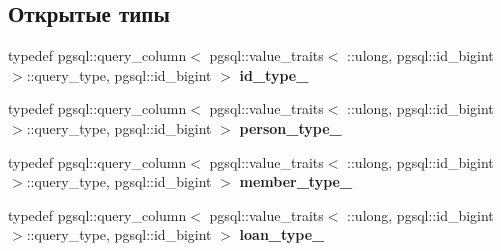 \subsection*{Открытые типы}
\begin{DoxyCompactItemize}
\item 
typedef pgsql\+::query\+\_\+column$<$ pgsql\+::value\+\_\+traits$<$ \+::ulong, pgsql\+::id\+\_\+bigint $>$\+::query\+\_\+type, pgsql\+::id\+\_\+bigint $>$ {\bfseries id\+\_\+type\+\_\+}\hypertarget{structodb_1_1pointer__query__columns_3_01_1_1kpk_1_1data_1_1_loan_oper_00_01id__pgsql_00_01_a_01_4_aa1aa4e5500584872557ff25b16da4b6d}{}\label{structodb_1_1pointer__query__columns_3_01_1_1kpk_1_1data_1_1_loan_oper_00_01id__pgsql_00_01_a_01_4_aa1aa4e5500584872557ff25b16da4b6d}

\item 
typedef pgsql\+::query\+\_\+column$<$ pgsql\+::value\+\_\+traits$<$ \+::ulong, pgsql\+::id\+\_\+bigint $>$\+::query\+\_\+type, pgsql\+::id\+\_\+bigint $>$ {\bfseries person\+\_\+type\+\_\+}\hypertarget{structodb_1_1pointer__query__columns_3_01_1_1kpk_1_1data_1_1_loan_oper_00_01id__pgsql_00_01_a_01_4_a4fe651a281803c40ddd143a82d36e95d}{}\label{structodb_1_1pointer__query__columns_3_01_1_1kpk_1_1data_1_1_loan_oper_00_01id__pgsql_00_01_a_01_4_a4fe651a281803c40ddd143a82d36e95d}

\item 
typedef pgsql\+::query\+\_\+column$<$ pgsql\+::value\+\_\+traits$<$ \+::ulong, pgsql\+::id\+\_\+bigint $>$\+::query\+\_\+type, pgsql\+::id\+\_\+bigint $>$ {\bfseries member\+\_\+type\+\_\+}\hypertarget{structodb_1_1pointer__query__columns_3_01_1_1kpk_1_1data_1_1_loan_oper_00_01id__pgsql_00_01_a_01_4_a4b6a9936fa698bfdcff4beaee162354d}{}\label{structodb_1_1pointer__query__columns_3_01_1_1kpk_1_1data_1_1_loan_oper_00_01id__pgsql_00_01_a_01_4_a4b6a9936fa698bfdcff4beaee162354d}

\item 
typedef pgsql\+::query\+\_\+column$<$ pgsql\+::value\+\_\+traits$<$ \+::ulong, pgsql\+::id\+\_\+bigint $>$\+::query\+\_\+type, pgsql\+::id\+\_\+bigint $>$ {\bfseries loan\+\_\+type\+\_\+}\hypertarget{structodb_1_1pointer__query__columns_3_01_1_1kpk_1_1data_1_1_loan_oper_00_01id__pgsql_00_01_a_01_4_a0b2b1ca2c2ba8402dc03f11d2267da73}{}\label{structodb_1_1pointer__query__columns_3_01_1_1kpk_1_1data_1_1_loan_oper_00_01id__pgsql_00_01_a_01_4_a0b2b1ca2c2ba8402dc03f11d2267da73}

\end{DoxyCompactItemize}
